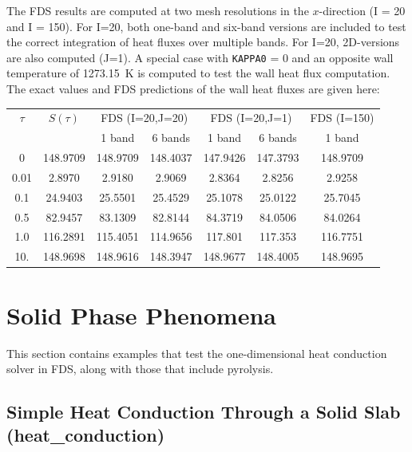 \documentclass[11pt]{book}
\newcommand{\ct}{\tt\small}
\begin{document}
The FDS results are computed at two mesh resolutions in the
$x$-direction (I = 20 and I = 150). For I=20, both one-band and
six-band versions are included to test the correct integration of heat
fluxes over multiple bands. For I=20, 2D-versions are also computed
(J=1). A special case with {\ct KAPPA0} = 0 and
an opposite wall temperature of 1273.15~K is computed to test the wall
heat flux computation. The exact values and FDS predictions of the
wall heat fluxes are given here:
\begin{center}
\begin{tabular}{|c|c|c|c|c|c|c|} \hline
$\tau$ & $S(\tau)$ & \multicolumn{2}{c}{FDS (I=20,J=20)}
           & \multicolumn{2}{c}{FDS (I=20,J=1)}
                   & FDS (I=150) \\
     &          & 1 band  & 6 bands   & 1 band & 6 bands & 1 band \\
                            \hline\hline
0    & 148.9709 & 148.9709&  148.4037 & 147.9426 &147.3793 &148.9709 \\
0.01 & 2.8970   & 2.9180  &  2.9069   & 2.8364   &2.8256   &2.9258   \\
0.1  & 24.9403  & 25.5501 &  25.4529  & 25.1078  &25.0122  &25.7045  \\
0.5  & 82.9457  & 83.1309 &  82.8144  & 84.3719  &84.0506  &84.0264  \\
1.0  & 116.2891 & 115.4051&  114.9656 & 117.801  &117.353  &116.7751 \\
10.  & 148.9698 & 148.9616&  148.3947 & 148.9677 &148.4005 &148.9695 \\ \hline
\end{tabular}
\end{center}



\clearpage

\section{Solid Phase Phenomena}

This section contains examples that test the one-dimensional heat conduction solver in FDS, along with those that include
pyrolysis.


\subsection{Simple Heat Conduction Through a Solid Slab ({\bf heat\_conduction}) }
\label{heat_conduction}
\end{document}
